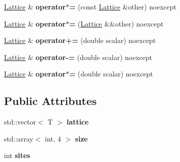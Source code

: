 \begin{DoxyCompactItemize}
\item 
\hyperlink{classLattice}{Lattice} \& {\bfseries operator$\ast$=} (const \hyperlink{classLattice}{Lattice} \&other) noexcept\hypertarget{classLattice_a8bbf23e229a86a1ac20d4d799411bf7e}{}\label{classLattice_a8bbf23e229a86a1ac20d4d799411bf7e}

\item 
\hyperlink{classLattice}{Lattice} \& {\bfseries operator$\ast$=} (\hyperlink{classLattice}{Lattice} \&\&other) noexcept\hypertarget{classLattice_acdc58066b4aa455eb6579bed8f4d2e6b}{}\label{classLattice_acdc58066b4aa455eb6579bed8f4d2e6b}

\item 
\hyperlink{classLattice}{Lattice} \& {\bfseries operator+=} (double scalar) noexcept\hypertarget{classLattice_a63b58993c23eb173009d8f47d31c9446}{}\label{classLattice_a63b58993c23eb173009d8f47d31c9446}

\item 
\hyperlink{classLattice}{Lattice} \& {\bfseries operator-\/=} (double scalar) noexcept\hypertarget{classLattice_a7bef43f0f3d27355c68d7b6cf945cd74}{}\label{classLattice_a7bef43f0f3d27355c68d7b6cf945cd74}

\item 
\hyperlink{classLattice}{Lattice} \& {\bfseries operator$\ast$=} (double scalar) noexcept\hypertarget{classLattice_a03c24714fb6d662c3b65d099b6538e41}{}\label{classLattice_a03c24714fb6d662c3b65d099b6538e41}

\end{DoxyCompactItemize}
\subsection*{Public Attributes}
\begin{DoxyCompactItemize}
\item 
std\+::vector$<$ T $>$ {\bfseries lattice}\hypertarget{classLattice_af008a9fb4d68830116171ad510dac00d}{}\label{classLattice_af008a9fb4d68830116171ad510dac00d}

\item 
std\+::array$<$ int, 4 $>$ {\bfseries size}\hypertarget{classLattice_a24efa6069bfbc8efceec45aa4048310b}{}\label{classLattice_a24efa6069bfbc8efceec45aa4048310b}

\item 
int {\bfseries sites}\hypertarget{classLattice_a445869fa94228c717650aefa85d02567}{}\label{classLattice_a445869fa94228c717650aefa85d02567}

\end{DoxyCompactItemize}
